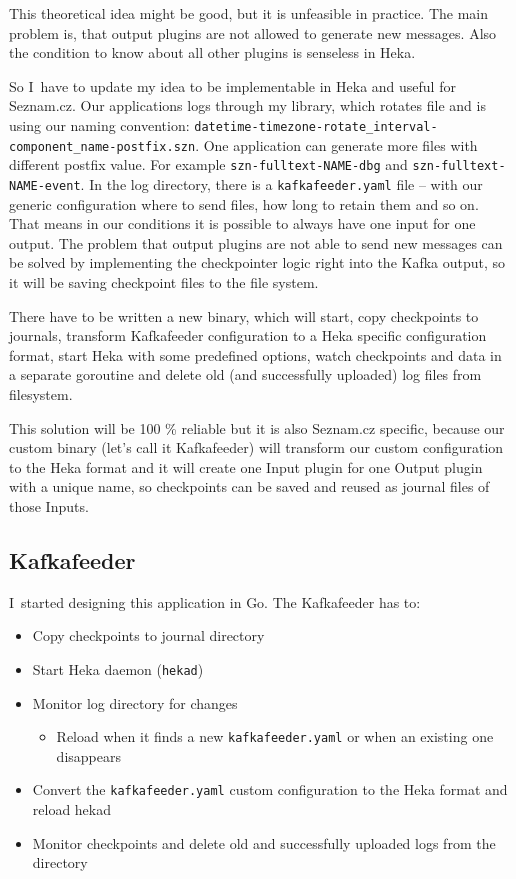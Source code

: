 This theoretical idea might be good, but it is unfeasible in practice. The main problem is, that output plugins are not allowed to generate new messages. Also the condition to know about all other plugins is senseless in Heka.

So I~have to update my idea to be implementable in Heka and useful for Seznam.cz. Our applications logs through my library, which rotates file and is using our naming convention: \lstinline{datetime-timezone-rotate_interval-component_name-postfix.szn}. One application can generate more files with different postfix value. For example \lstinline{szn-fulltext-NAME-dbg} and \lstinline{szn-fulltext-NAME-event}. In the log directory, there is a \lstinline{kafkafeeder.yaml} file -- with our generic configuration where to send files, how long to retain them and so on. That means in our conditions it is possible to always have one input for one output. The problem that output plugins are not able to send new messages can be solved by implementing the checkpointer logic right into the Kafka output, so it will be saving checkpoint files to the file system.

There have to be written a new binary, which will start, copy checkpoints to journals, transform Kafkafeeder configuration to a Heka specific configuration format, start Heka with some predefined options, watch checkpoints and data in a separate goroutine and delete old (and successfully uploaded) log files from filesystem.

This solution will be 100 \% reliable but it is also Seznam.cz specific, because our custom binary (let’s call it Kafkafeeder) will transform our custom configuration to the Heka format  and it will create one Input plugin for one Output plugin with a unique name, so checkpoints can be saved and reused as journal files of those Inputs.
 
\subsection{Kafkafeeder}
I~started designing this application in Go. The Kafkafeeder has to:
\begin{itemize} 
  \item	Copy checkpoints to journal directory
  \item	Start Heka daemon (\lstinline{hekad})
  \item	Monitor log directory for changes
    \begin{itemize}
      \item Reload when it finds a new \lstinline{kafkafeeder.yaml} or when an existing one disappears
    \end{itemize}
  \item	Convert the \lstinline{kafkafeeder.yaml} custom configuration to the Heka format and reload hekad 
  \item	Monitor checkpoints and delete old and successfully uploaded logs from the directory
\end{itemize}

